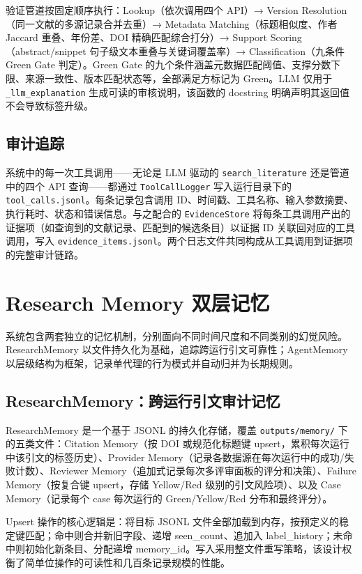 \documentclass[11pt,a4paper]{ctexart}
\begin{document}
验证管道按固定顺序执行：Lookup（依次调用四个 API）→ Version Resolution（同一文献的多源记录合并去重）→ Metadata Matching（标题相似度、作者 Jaccard 重叠、年份差、DOI 精确匹配综合打分）→ Support Scoring（abstract/snippet 句子级文本重叠与关键词覆盖率）→ Classification（九条件 Green Gate 判定）。Green Gate 的九个条件涵盖元数据匹配阈值、支撑分数下限、来源一致性、版本匹配状态等，全部满足方标记为 Green。LLM 仅用于 \texttt{\_llm\_explanation} 生成可读的审核说明，该函数的 docstring 明确声明其返回值不会导致标签升级。

\subsection{审计追踪}

系统中的每一次工具调用——无论是 LLM 驱动的 \texttt{search\_literature} 还是管道中的四个 API 查询——都通过 \texttt{ToolCallLogger} 写入运行目录下的 \texttt{tool\_calls.jsonl}。每条记录包含调用 ID、时间戳、工具名称、输入参数摘要、执行耗时、状态和错误信息。与之配合的 \texttt{EvidenceStore} 将每条工具调用产出的证据项（如查询到的文献记录、匹配到的候选条目）以证据 ID 关联回对应的工具调用，写入 \texttt{evidence\_items.jsonl}。两个日志文件共同构成从工具调用到证据项的完整审计链路。

\section{Research Memory 双层记忆}

系统包含两套独立的记忆机制，分别面向不同时间尺度和不同类别的幻觉风险。ResearchMemory 以文件持久化为基础，追踪跨运行引文可靠性；AgentMemory 以层级结构为框架，记录单代理的行为模式并自动归并为长期规则。

\subsection{ResearchMemory：跨运行引文审计记忆}

ResearchMemory 是一个基于 JSONL 的持久化存储，覆盖 \texttt{outputs/memory/} 下的五类文件：Citation Memory（按 DOI 或规范化标题键 upsert，累积每次运行中该引文的标签历史）、Provider Memory（记录各数据源在每次运行中的成功/失败计数）、Reviewer Memory（追加式记录每次多评审面板的评分和决策）、Failure Memory（按复合键 upsert，存储 Yellow/Red 级别的引文风险项）、以及 Case Memory（记录每个 case 每次运行的 Green/Yellow/Red 分布和最终评分）。

Upsert 操作的核心逻辑是：将目标 JSONL 文件全部加载到内存，按预定义的稳定键匹配；命中则合并新旧字段、递增 seen\_count、追加入 label\_history；未命中则初始化新条目、分配递增 memory\_id。写入采用整文件重写策略，该设计权衡了简单位操作的可读性和几百条记录规模的性能。
\end{document}
